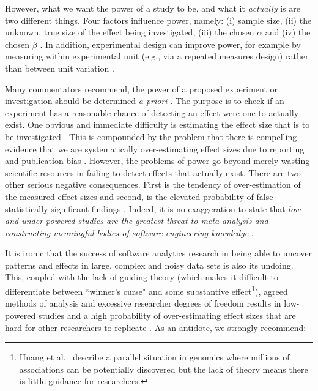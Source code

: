 \documentclass[preprint,10pt]{elsarticle}
\newcommand{\RED}{\color{red}}
\newcommand{\BLACK}{\color{black}}
\begin{document}
\RED However, what we want the power of a study to be, and what it \textit{actually} is are two different things.  
\BLACK 
Four factors influence power, namely: (i) sample size, (ii) the unknown, true size of the effect being investigated, (iii) the chosen $\alpha$ and (iv) the chosen $\beta$ \cite{Cohe92,Elli10}.  In addition, experimental design can improve power, for example by measuring within experimental unit (e.g., via a repeated measures design) rather than between unit variation \cite{McCl00}.  

Many commentators recommend, the power of a proposed experiment or investigation should be determined \emph{a priori} \cite{Dyba06}.  The purpose is to check if an experiment has a reasonable chance of detecting an effect were one to actually exist.  One obvious and immediate difficulty is estimating the effect size that is to be investigated \cite{Maxw08}.  This is compounded by the problem that there is compelling evidence that we are systematically over-estimating effect sizes due to reporting and publication bias \cite{Butt13,Jorg16}.  However, the problems of power go beyond merely wasting scientific resources in failing to detect effects that actually exist.  There are two other serious negative consequences.  First is the tendency of over-estimation of the measured effect sizes and second, is the elevated probability of false statistically significant findings \cite{Ioan05,Colq14}.  Indeed, it is no exaggeration to state that \textit{low and under-powered studies are the greatest threat to meta-analysis and constructing meaningful bodies of software engineering knowledge} \cite{Butt13,Szuc17}.

It is ironic that the success of software analytics research in being able to uncover patterns and effects in large, complex and noisy data sets is also its undoing.  This, coupled with the lack of guiding theory (which makes it difficult to differentiate between ``winner's curse" and some substantive effect\footnote{\RED Huang et al.~\cite{Huan17} describe a parallel situation in genomics where millions of associations can be potentially discovered but the lack of theory means there is little guidance for researchers. \BLACK}), agreed methods of analysis and excessive researcher degrees of freedom \cite{Silb15,Loke17} results in low-powered studies and a high probability of over-estimating effect sizes that are hard for other researchers to replicate \cite{Ioan05,Shep14,Jorg16}.  As an antidote, we strongly recommend:
\end{document}
